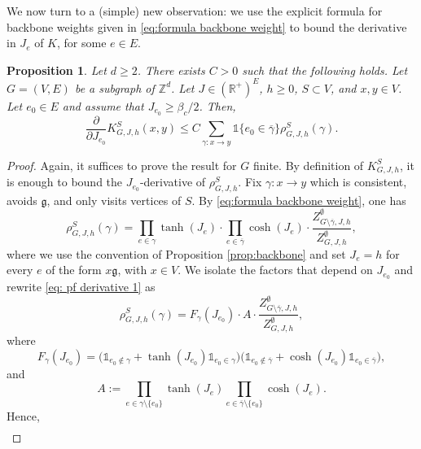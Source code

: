 \documentclass[10pt,a4paper]{amsart}
\numberwithin{equation}{section}
\newtheorem{Prop}[Thm]{Proposition}
\newcommand\fg{\mathfrak{g}}
\begin{document}
We now turn to a (simple) new observation: we use the explicit formula for backbone weights given in \eqref{eq:formula backbone weight} to bound the derivative in $J_e$ of $K$, for some $e\in E$. 
\begin{Prop}\label{prop: derivative K} Let $d\geq 2$. There exists $C>0$ such that the following holds. Let $G=(V,E)$ be a subgraph of $\mathbb Z^d$.  Let $J\in (\mathbb R^+)^E$, $h\geq 0$, $S\subset V$, and $x,y\in V$. Let $e_0\in E$ and assume that $J_{e_0}\geq \beta_c/2$. Then,
\begin{equation}
	\frac{\partial}{\partial J_{e_0}}K_{G,J,h}^S(x,y)\leq C\sum_{\gamma:x\rightarrow y}\mathds{1}\{e_0\in \overline{\gamma}\}\rho_{G,J,h}^S(\gamma).
\end{equation}
\end{Prop}
\begin{proof} Again, it suffices to prove the result for $G$ finite. By definition of $K_{G,J,h}^S$, it is enough to bound the $J_{e_0}$-derivative of $\rho_{G,J,h}^S$. Fix $\gamma:x\rightarrow y$ which is consistent, avoids $\mathfrak{g}$, and only visits vertices of $S$. By \eqref{eq:formula backbone weight}, one has
\begin{equation}\label{eq: pf derivative 1}
	\rho_{G,J,h}^S(\gamma)=\prod_{e\in \gamma}\tanh(J_e) \cdot \prod_{e\in \overline{\gamma}}\cosh(J_e)\cdot \frac{Z_{G\setminus \overline{\gamma},J,h}^\emptyset}{Z_{G,J,h}^\emptyset},
\end{equation}
where we use the convention of Proposition \ref{prop:backbone} and set $J_e=h$ for every $e$ of the form $x\fg$, with $x\in V$.
We isolate the factors that depend on $J_{e_0}$ and rewrite \eqref{eq: pf derivative 1} as
\begin{equation}
	\rho_{G,J,h}^S(\gamma)=F_\gamma(J_{e_0})\cdot A \cdot \frac{Z_{G\setminus \overline{\gamma},J,h}^\emptyset}{Z_{G,J,h}^\emptyset},
\end{equation}
where
\begin{equation}
	F_\gamma(J_{e_0})=\big(\mathds{1}_{e_0\notin \gamma}+\tanh(J_{e_0})\mathds{1}_{e_0\in \gamma}\big)\big(\mathds{1}_{e_0\notin \overline{\gamma}}+\cosh(J_{e_0})\mathds{1}_{e_0\in \overline{\gamma}}\big),
\end{equation}
and
\begin{equation}
	A:=\prod_{e\in \gamma\setminus\{e_0\}}\tanh(J_e)\prod_{e\in \overline{\gamma}\setminus \{e_0\}}\cosh(J_e).
\end{equation}
Hence,
\begin{align}\label{eq: pf derivative 2}

\end{align}
\end{proof}
\end{document}
